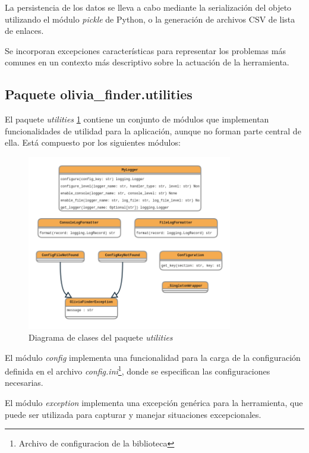 La persistencia de los datos se lleva a cabo mediante la serialización del objeto utilizando el
módulo \textit{pickle} de Python, o la generación de archivos CSV de lista de enlaces.

Se incorporan excepciones características para representar los problemas más comunes en un contexto
más descriptivo sobre la actuación de la herramienta.


\subsection{Paquete olivia\_finder.utilities}

El paquete \textit{utilities} \ref{fig:utilities_classes} contiene un conjunto de módulos que implementan funcionalidades de
utilidad para la aplicación, aunque no forman parte central de ella. Está compuesto por los siguientes módulos:

\begin{figure}[ht!]
    \centering
    \includegraphics[width=0.8\textwidth]{img/anexos/utilities_classes.png}
    \caption{Diagrama de clases del paquete \textit{utilities}}
    \label{fig:utilities_classes}
\end{figure}



El módulo \textit{config} implementa una funcionalidad para la carga de la configuración
definida en el archivo \textit{config.ini}\footnote{Archivo de configuracion de la biblioteca}, donde se especifican las configuraciones necesarias.

El módulo \textit{exception} implementa una excepción genérica para la herramienta, que
puede ser utilizada para capturar y manejar situaciones excepcionales.

